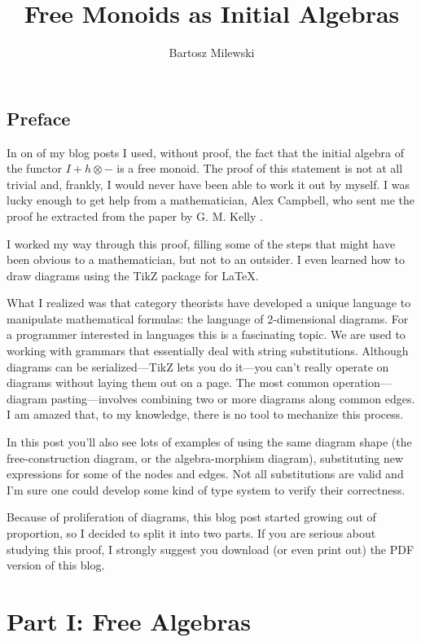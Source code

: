 \documentclass[letterpaper, 10 pt, conference]{ieeeconf}
\title{\LARGE \bf
Free Monoids as Initial Algebras
}
\author{Bartosz Milewski}
\begin{document}
\maketitle
\thispagestyle{empty}
\pagestyle{empty}

\subsection{Preface}

In on of my blog posts I used, without proof, the fact that the initial algebra of the functor $I + h \otimes -$ is a free monoid. The proof of this statement is not at all trivial and, frankly, I would never have been able to work it out by myself. I was lucky enough to get help from a mathematician, Alex Campbell, who sent me the proof he extracted from the paper by G. M. Kelly \cite{Kelly}. 

I worked my way through this proof, filling some of the steps that might have been obvious to a mathematician, but not to an outsider. I even learned how to draw diagrams using the TikZ package for \LaTeX. 

What I realized was that category theorists have developed a unique language to manipulate mathematical formulas: the language of 2-dimensional diagrams. For a programmer interested in languages this is a fascinating topic. We are used to working with grammars that essentially deal with string substitutions. Although diagrams can be serialized---TikZ lets you do it---you can't really operate on diagrams without laying them out on a page. The most common operation---diagram pasting---involves combining two or more diagrams along common edges. I am amazed that, to my knowledge, there is no tool to mechanize this process. 

In this post you'll also see lots of examples of using the same diagram shape (the free-construction diagram, or the algebra-morphism diagram), substituting new expressions for some of the nodes and edges. Not all substitutions are valid and I'm sure one could develop some kind of type system to verify their correctness. 

Because of proliferation of diagrams, this blog post started growing out of proportion, so I decided to split it into two parts. If you are serious about studying this proof, I strongly suggest you download (or even print out) the PDF version of this blog.

\section{Part I: Free Algebras}
\end{document}

